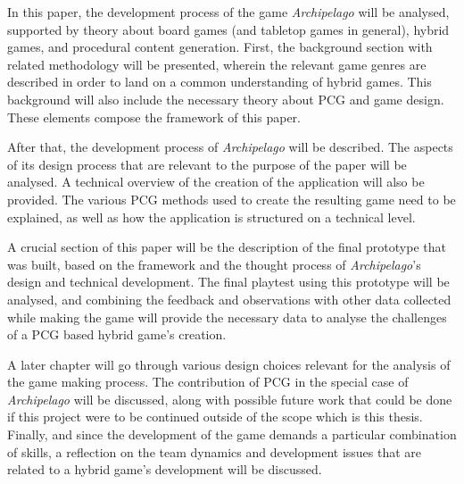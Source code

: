 In this paper, the development process of the game \textit{Archipelago} will be analysed, supported by theory about board games (and tabletop games in general), hybrid games, and procedural content generation. First, the background section with related methodology will be presented, wherein the relevant game genres are described in order to land on a common understanding of hybrid games. This background will also include the necessary theory about PCG and game design. These elements compose the framework of this paper.

After that, the development process of \textit{Archipelago} will be described. The aspects of its design process that are relevant to the purpose of the paper will be analysed. A technical overview of the creation of the application will also be provided. The various PCG methods used to create the resulting game need to be explained, as well as how the application is structured on a technical level. 

A crucial section of this paper will be the description of the final prototype that was built, based on the framework and the thought process of \textit{Archipelago}'s design and technical development. The final playtest using this prototype will be analysed, and combining the feedback and observations with other data collected while making the game will provide the necessary data to analyse the challenges of a PCG based hybrid game's creation.

A later chapter will go through various design choices relevant for the analysis of the game making process. The contribution of PCG in the special case of \textit{Archipelago} will be discussed, along with possible future work that could be done if this project were to be continued outside of the scope which is this thesis. Finally, and since the development of the game demands a particular combination of skills, a reflection on the team dynamics and development issues that are related to a hybrid game's development will be discussed.
